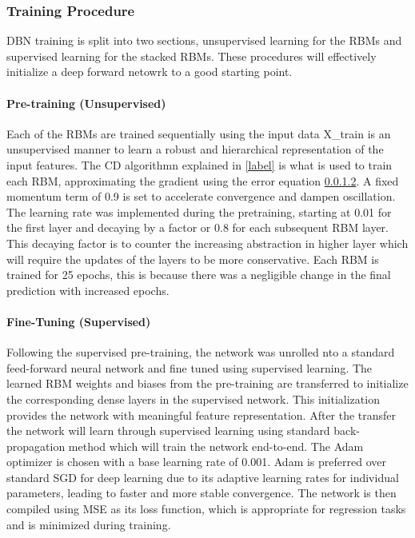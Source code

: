 \subsubsection{Training Procedure}
 DBN training is split into two sections, unsupervised learning for the RBMs and supervised learning for the stacked RBMs. These procedures will effectively initialize a deep forward netowrk to a good starting point.
 
 \paragraph{Pre-training (Unsupervised)}Each of the RBMs are trained sequentially using the input data X\_train is an unsupervised manner to learn a robust and hierarchical representation of the input features. The CD algorithmn explained in \ref{label} is what is used to train each RBM, approximating the gradient using the error equation \ref{}. A fixed momentum term of 0.9 is set to accelerate convergence and dampen oscillation.\\ The learning rate was implemented during the pretraining, starting at 0.01 for the first layer and decaying by a factor or 0.8 for each subsequent RBM layer. This decaying factor is to counter the increasing abstraction in higher layer which will require the updates of the layers to be more conservative. Each RBM is trained for 25 epochs, this is because there was a negligible change in the final prediction with increased epochs.
 
 \paragraph{Fine-Tuning (Supervised)} Following the supervised pre-training, the network was unrolled nto a standard feed-forward neural network and fine tuned using supervised learning. The learned RBM weights and biases from the pre-training are transferred to initialize the corresponding dense layers in the supervised network. This initialization provides the network with meaningful feature representation. After the transfer the network will learn through supervised learning using standard back-propagation method which will train the network end-to-end.
 The Adam optimizer is chosen with a base learning rate of 0.001. Adam is preferred over standard SGD for deep learning due to its adaptive learning rates for individual parameters, leading to faster and more stable convergence. The network is then compiled using MSE as its loss function, which is appropriate for regression tasks and is minimized during training.
 
